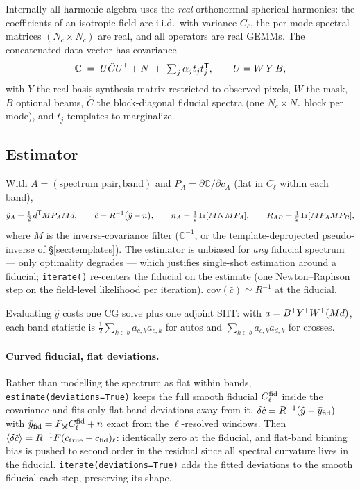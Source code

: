 \documentclass[11pt,a4paper]{article}
\newcommand{\C}{\mathbb{C}}
\newcommand{\Tr}{\mathrm{Tr}}
\begin{document}
Internally all harmonic algebra uses the \emph{real} orthonormal spherical
harmonics: the coefficients of an isotropic field are i.i.d.\ with variance
$C_\ell$, the per-mode spectral matrices $(N_c\times N_c)$ are real, and all
operators are real GEMMs.  The concatenated data vector has covariance
\begin{equation}
  \C \;=\; U\hat C U^{\sf T} + N \;+\;\textstyle\sum_j \alpha_j t_j t_j^{\sf T},
  \qquad U = W\,Y\,B,
  \label{eq:cov}
\end{equation}
with $Y$ the real-basis synthesis matrix restricted to observed pixels, $W$
the mask, $B$ optional beams, $\hat C$ the block-diagonal fiducial spectra
(one $N_c\times N_c$ block per mode), and $t_j$ templates to marginalize.

\subsection{Estimator}
With $A=(\text{spectrum pair},\text{band})$ and $P_A=\partial\C/\partial c_A$
(flat in $C_\ell$ within each band),
\begin{equation}
  \hat y_A = \tfrac12\, d^{\sf T} M P_A M d,\qquad
  \hat c = R^{-1}\big(\hat y - n\big),\qquad
  n_A = \tfrac12\Tr[M N M P_A],\qquad
  R_{AB} = \tfrac12\Tr[M P_A M P_B],
  \label{eq:qml}
\end{equation}
where $M$ is the inverse-covariance filter ($\C^{-1}$, or the
template-deprojected pseudo-inverse of \S\ref{sec:templates}).  The
estimator is unbiased for \emph{any} fiducial spectrum --- only optimality
degrades --- which justifies single-shot estimation around a fiducial;
\texttt{iterate()} re-centers the fiducial on the estimate (one
Newton--Raphson step on the field-level likelihood per iteration).
$\mathrm{cov}(\hat c)\simeq R^{-1}$ at the fiducial.

Evaluating $\hat y$ costs one CG solve plus one adjoint SHT: with
$a = B^{\sf T}Y^{\sf T}W^{\sf T} (Md)$, each band statistic is
$\tfrac12\sum_{k\in b} a_{c,k} a_{c,k}$ for autos and
$\sum_{k\in b} a_{c,k} a_{d,k}$ for crosses.

\paragraph{Curved fiducial, flat deviations.}  Rather than modelling the
spectrum as flat within bands, \texttt{estimate(deviations=True)} keeps
the full smooth fiducial $C^{\rm fid}_\ell$ inside the covariance and fits
only flat band deviations away from it,
$\delta\hat c = R^{-1}(\hat y - \bar y_{\rm fid})$ with
$\bar y_{\rm fid} = F_{b\ell}C^{\rm fid}_\ell + n$ exact from the
$\ell$-resolved windows.  Then
$\langle\delta\hat c\rangle = R^{-1}F(c_{\rm true}-c_{\rm fid})_\ell$:
identically zero at the fiducial, and flat-band binning bias is pushed to
second order in the residual since all spectral curvature lives in the
fiducial.  \texttt{iterate(deviations=True)} adds the fitted deviations to
the smooth fiducial each step, preserving its shape.
\end{document}
